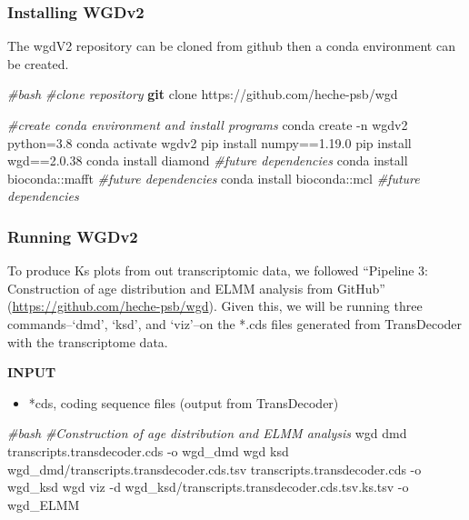 \documentclass[
  12pt,
]{article}
\newenvironment{Shaded}{\begin{snugshade}}{\end{snugshade}}
\newcommand{\AttributeTok}[1]{\textcolor[rgb]{0.13,0.29,0.53}{#1}}
\newcommand{\CommentTok}[1]{\textcolor[rgb]{0.56,0.35,0.01}{\textit{#1}}}
\newcommand{\ExtensionTok}[1]{#1}
\newcommand{\FunctionTok}[1]{\textcolor[rgb]{0.13,0.29,0.53}{\textbf{#1}}}
\newcommand{\NormalTok}[1]{#1}
\providecommand{\tightlist}{%
  \setlength{\itemsep}{0pt}\setlength{\parskip}{0pt}}
\begin{document}
\hypertarget{installing-wgdv2}{%
\subsubsection{Installing WGDv2}\label{installing-wgdv2}}

The wgdV2 repository can be cloned from github then a conda environment can be created.

\begin{Shaded}
\begin{Highlighting}[]
\CommentTok{\#bash}
\CommentTok{\#clone repository }
\FunctionTok{git}\NormalTok{ clone https://github.com/heche{-}psb/wgd }

\CommentTok{\#create conda environment and install programs}
\ExtensionTok{conda}\NormalTok{ create }\AttributeTok{{-}n}\NormalTok{ wgdv2 python=3.8}
\ExtensionTok{conda}\NormalTok{ activate wgdv2}
\ExtensionTok{pip}\NormalTok{ install numpy==1.19.0}
\ExtensionTok{pip}\NormalTok{ install wgd==2.0.38}
\ExtensionTok{conda}\NormalTok{ install diamond }\CommentTok{\#future dependencies}
\ExtensionTok{conda}\NormalTok{ install bioconda::mafft }\CommentTok{\#future dependencies}
\ExtensionTok{conda}\NormalTok{ install bioconda::mcl }\CommentTok{\#future dependencies}
\end{Highlighting}
\end{Shaded}

\hypertarget{running-wgdv2}{%
\subsubsection{Running WGDv2}\label{running-wgdv2}}

To produce Ks plots from out transcriptomic data, we followed ``Pipeline 3: Construction of age distribution and ELMM analysis from GitHub'' (\url{https://github.com/heche-psb/wgd}). Given this, we will be running three commands--`dmd', `ksd', and `viz'--on the *.cds files generated from TransDecoder with the transcriptome data.

\textbf{INPUT}

\begin{itemize}
\tightlist
\item
  *cds, coding sequence files (output from TransDecoder)
\end{itemize}

\begin{Shaded}
\begin{Highlighting}[]
\CommentTok{\#bash}
\CommentTok{\#Construction of age distribution and ELMM analysis}
\ExtensionTok{wgd}\NormalTok{ dmd transcripts.transdecoder.cds }\AttributeTok{{-}o}\NormalTok{ wgd\_dmd}
\ExtensionTok{wgd}\NormalTok{ ksd wgd\_dmd/transcripts.transdecoder.cds.tsv transcripts.transdecoder.cds }\AttributeTok{{-}o}\NormalTok{ wgd\_ksd}
\ExtensionTok{wgd}\NormalTok{ viz }\AttributeTok{{-}d}\NormalTok{ wgd\_ksd/transcripts.transdecoder.cds.tsv.ks.tsv }\AttributeTok{{-}o}\NormalTok{ wgd\_ELMM}
\end{Highlighting}
\end{Shaded}
\end{document}
